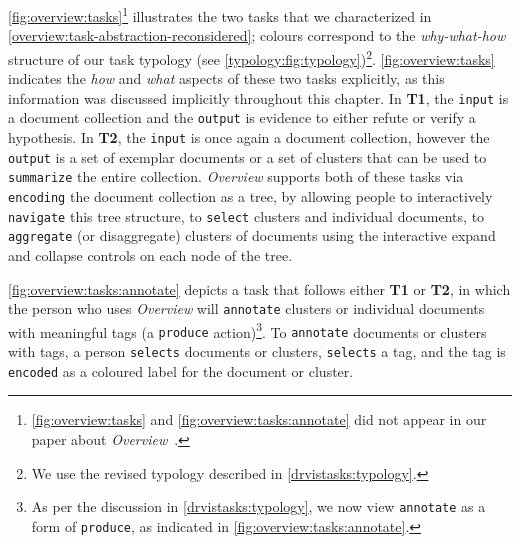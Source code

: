 \autoref{fig:overview:tasks}\footnote{\autoref{fig:overview:tasks} and \autoref{fig:overview:tasks:annotate} did not appear in our paper about {\it Overview}~\cite{Brehmer2014}.} illustrates the two tasks that we characterized in \autoref{overview:task-abstraction-reconsidered}; colours correspond to the {\it why-what-how} structure of our task typology (see \autoref{typology:fig:typology})\footnote{We use the revised typology described in \autoref{drvistasks:typology}.}.
\autoref{fig:overview:tasks} indicates the {\it how} and {\it what} aspects of these two tasks explicitly, as this information was discussed implicitly throughout this chapter. 
In {\bf T1}, the {\tt input} is a document collection and the {\tt output} is evidence to either refute or verify a hypothesis.
In {\bf T2}, the {\tt input} is once again a document collection, however the {\tt output} is a set of exemplar documents or a set of clusters that can be used to {\tt summarize} the entire collection.
{\it Overview} supports both of these tasks via {\tt encoding} the document collection as a tree, by allowing people to interactively {\tt navigate} this tree structure, to {\tt select} clusters and individual documents, to {\tt aggregate} (or disaggregate) clusters of documents using the interactive expand and collapse controls on each node of the tree.

\autoref{fig:overview:tasks:annotate} depicts a task that follows either {\bf T1} or {\bf T2}, in which the person who uses {\it Overview} will {\tt annotate} clusters or individual documents with meaningful tags (a {\tt produce} action)\footnote{As per the discussion in \autoref{drvistasks:typology}, we now view {\tt annotate} as a form of {\tt produce}, as indicated in \autoref{fig:overview:tasks:annotate}.}.
To {\tt annotate} documents or clusters with tags, a person {\tt selects} documents or clusters, {\tt selects} a tag, and the tag is {\tt encoded} as a coloured label for the document or cluster.

